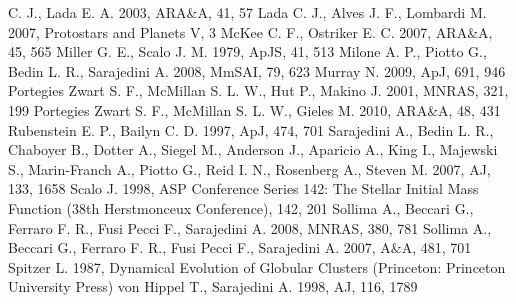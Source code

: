 \begin{thebibliography}{99}
  C. J., Lada E. A. 2003, ARA\&A, 41, 57
 Lada C. J., Alves J. F., Lombardi
  M. 2007, Protostars and Planets V, 3
  McKee C. F., Ostriker E. C. 2007, ARA\&A, 45, 565
  Miller G. E., Scalo J. M. 1979, ApJS, 41, 513
  Milone A. P., Piotto G., Bedin L. R., Sarajedini A. 2008, MmSAI, 79,
  623
 Murray
  N. 2009, ApJ, 691, 946
 Portegies Zwart S. F., McMillan
  S. L. W., Hut P., Makino J. 2001, MNRAS, 321, 199
 Portegies Zwart S. F., McMillan
  S. L. W., Gieles M. 2010, ARA\&A, 48, 431
 Rubenstein E. P., Bailyn C. D. 1997,
  ApJ, 474, 701
  Sarajedini A., Bedin L. R., Chaboyer B., Dotter  A., Siegel M.,
  Anderson J., Aparicio A., King I., Majewski S., Marin-Franch A.,
  Piotto G., Reid  I. N., Rosenberg A., Steven M. 2007, AJ, 133, 1658
 Scalo J. 1998,
  ASP Conference Series 142: The Stellar Initial Mass Function (38th
  Herstmonceux Conference), 142, 201
  Sollima A., Beccari G., Ferraro F. R., Fusi Pecci F., Sarajedini
  A. 2008, MNRAS, 380, 781
  Sollima A., Beccari G., Ferraro F. R., Fusi Pecci F., Sarajedini
  A. 2007, A\&A, 481, 701
 Spitzer
  L. 1987, Dynamical Evolution of Globular Clusters (Princeton:
  Princeton University Press)
 von Hippel T., Sarajedini A. 1998,
  AJ, 116, 1789

\end{thebibliography}



%
